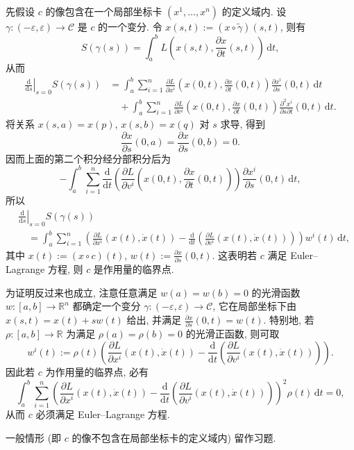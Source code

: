 \begin{RiemannProof}
先假设 $c$ 的像包含在一个局部坐标卡 $(x^1,\ldots,x^n)$ 的定义域内. 设 $\gamma:(-\varepsilon,\varepsilon)\to\mathcal{C}$ 是 $c$ 的一个变分. 令 $x(s,t):=(x\circ\widetilde\gamma)(s,t)$, 则有
\[
  S(\gamma(s))=\int_a^b L\left(x(s,t),\frac{\partial x}{\partial t}(s,t)\right)\,\mathrm{d}t,
\]
从而
\begin{align*}
  \left.\frac{\mathrm{d}}{\mathrm{d}s}\right|_{s=0}S(\gamma(s))
  &=\int_a^b\sum_{i=1}^n\frac{\partial L}{\partial x^i}
    \left(x(0,t),\frac{\partial x}{\partial t}(0,t)\right)
    \frac{\partial x^i}{\partial s}(0,t)\,\mathrm{d}t\\
  &\quad+\int_a^b\sum_{i=1}^n\frac{\partial L}{\partial v^i}
    \left(x(0,t),\frac{\partial x}{\partial t}(0,t)\right)
    \frac{\partial^2x^i}{\partial s\partial t}(0,t)\,\mathrm{d}t.
\end{align*}
将关系 $x(s,a)=x(p)$, $x(s,b)=x(q)$ 对 $s$ 求导, 得到
\[
  \frac{\partial x}{\partial s}(0,a)=\frac{\partial x}{\partial s}(0,b)=0.
\]
因而上面的第二个积分经分部积分后为
\[
  -\int_a^b\sum_{i=1}^n\frac{\mathrm{d}}{\mathrm{d}t}
  \left(\frac{\partial L}{\partial v^i}\left(x(0,t),\frac{\partial x}{\partial t}(0,t)\right)\right)
  \frac{\partial x^i}{\partial s}(0,t)\,\mathrm{d}t,
\]
所以
\begin{align*}
  &\left.\frac{\mathrm{d}}{\mathrm{d}s}\right|_{s=0}S(\gamma(s))\\
  &\quad=\int_a^b\sum_{i=1}^n\left(\frac{\partial L}{\partial x^i}(x(t),\dot x(t))
      -\frac{\mathrm{d}}{\mathrm{d}t}\left(\frac{\partial L}{\partial v^i}(x(t),\dot x(t))\right)\right)
      w^i(t)\,\mathrm{d}t,
\end{align*}
其中 $x(t):=(x\circ c)(t)$, $w(t):=\frac{\partial x}{\partial s}(0,t)$. 这表明若 $c$ 满足 Euler–Lagrange 方程, 则 $c$ 是作用量的临界点.

为证明反过来也成立, 注意任意满足 $w(a)=w(b)=0$ 的光滑函数 $w:[a,b]\to\mathbb{R}^n$ 都确定一个变分 $\gamma:(-\varepsilon,\varepsilon)\to\mathcal{C}$, 它在局部坐标下由 $x(s,t)=x(t)+sw(t)$ 给出, 并满足 $\frac{\partial x}{\partial s}(0,t)=w(t)$. 特别地, 若 $\rho:[a,b]\to\mathbb{R}$ 为满足 $\rho(a)=\rho(b)=0$ 的光滑正函数, 则可取
\[
  w^i(t):=\rho(t)\left(\frac{\partial L}{\partial x^i}(x(t),\dot x(t))
    -\frac{\mathrm{d}}{\mathrm{d}t}\left(\frac{\partial L}{\partial v^i}(x(t),\dot x(t))\right)\right).
\]
因此若 $c$ 为作用量的临界点, 必有
\[
  \int_a^b\sum_{i=1}^n\left(\frac{\partial L}{\partial x^i}(x(t),\dot x(t))
    -\frac{\mathrm{d}}{\mathrm{d}t}\left(\frac{\partial L}{\partial v^i}(x(t),\dot x(t))\right)\right)^2
    \rho(t)\,\mathrm{d}t=0,
\]
从而 $c$ 必须满足 Euler–Lagrange 方程.

一般情形 (即 $c$ 的像不包含在局部坐标卡的定义域内) 留作习题.
\end{RiemannProof}

